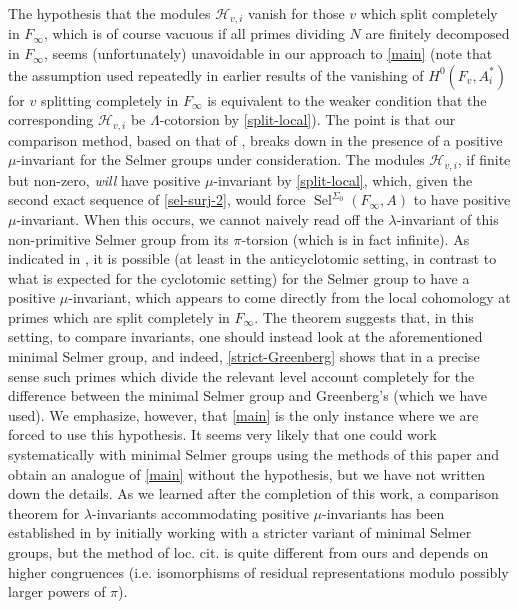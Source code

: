 \documentclass[12 pt]{amsart}
\theoremstyle{plain}
\theoremstyle{definition}
\numberwithin{equation}{section}
\numberwithin{table}{section}
\begin{document}
\indent The hypothesis that the modules $\mathcal{H}_{v,i}$ vanish for those $v$ which split completely in $F_\infty$, which is of course vacuous if all primes dividing $N$ are finitely decomposed in $F_\infty$, seems (unfortunately) unavoidable in our approach to \cref{main} (note that the assumption used repeatedly in earlier results of the vanishing of $H^0(F_v,A_i^*)$ for $v$ splitting completely in $F_\infty$ is equivalent to the weaker condition that the corresponding $\mathcal{H}_{v,i}$ be $\Lambda$-cotorsion by \cref{split-local}). The point is that our comparison method, based on that of \cite{GV00}, breaks down in the presence of a positive $\mu$-invariant for the Selmer groups under consideration. The modules $\mathcal{H}_{v,i}$, if finite but non-zero, \emph{will} have positive $\mu$-invariant by \cref{split-local}, which, given the second exact sequence of \cref{sel-surj-2}, would force $\operatorname{Sel}^{\Sigma_0}(F_\infty,A)$ to have positive $\mu$-invariant. When this occurs, we cannot naively read off the $\lambda$-invariant of this non-primitive Selmer group from its $\pi$-torsion (which is in fact infinite). As indicated in \cite[Theorem 1.1]{PW11}, it is possible (at least in the anticyclotomic setting, in contrast to what is expected for the cyclotomic setting) for the Selmer group to have a positive $\mu$-invariant, which appears to come directly from the local cohomology at primes which are split completely in $F_\infty$. The theorem suggests that, in this setting, to compare invariants, one should instead look at the aforementioned minimal Selmer group, and indeed, \cref{strict-Greenberg} shows that in a precise sense such primes which divide the relevant level account completely for the difference between the minimal Selmer group and Greenberg's (which we have used). We emphasize, however, that \cref{main} is the only instance where we are forced to use this hypothesis. It seems very likely that one could work systematically with minimal Selmer groups using the methods of this paper and obtain an analogue of \cref{main} without the hypothesis, but we have not written down the details. As we learned after the completion of this work, a comparison theorem for $\lambda$-invariants accommodating positive $\mu$-invariants has been established in \cite{Hach11} by initially working with a stricter variant of minimal Selmer groups, but the method of loc. cit. is quite different from ours and depends on higher congruences (i.e. isomorphisms of residual representations modulo possibly larger powers of $\pi$).
\appendix
\end{document}
